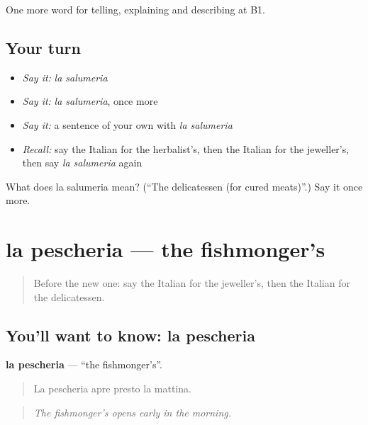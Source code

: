 \begin{grammarlens}[title={What you've built}]
One more word for telling, explaining and describing at B1.
\end{grammarlens}

\subsection*{Your turn}
\begin{itemize}
\raggedright
  \item \emph{Say it:} \emph{la salumeria}
  \item \emph{Say it:} \emph{la salumeria}, once more
  \item \emph{Say it:} a sentence of your own with \emph{la salumeria}
  \item \emph{Recall:} say the Italian for the herbalist's, then the Italian for the jeweller's, then say \emph{la salumeria} again
\end{itemize}

\begin{tcolorbox}[breakable,colback=teal!4,colframe=teal!35!black,title={Before you move on}]
What does la salumeria mean? (\textquotedblleft{}The delicatessen (for cured meats)\textquotedblright{}.) Say it once more.
\end{tcolorbox}
\section[la pescheria]{la pescheria — the fishmonger's}

\label{lesson:IT-C454-pescheria}



\begin{quote}
Before the new one: say the Italian for the jeweller's, then the Italian for the delicatessen.
\end{quote}

\subsection*{You'll want to know: la pescheria}
\textbf{la pescheria} — \textquotedblleft{}the fishmonger's\textquotedblright{}.

\begin{quote}
La pescheria apre presto la mattina.
\end{quote}

\begin{quote}
\emph{The fishmonger's opens early in the morning.}
\end{quote}

